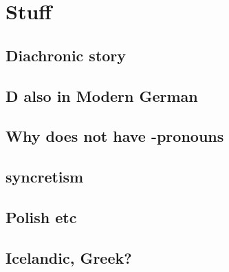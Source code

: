 
\chapter{Stuff}

\section{Diachronic story}

\section{D also in Modern German}

\section{Why  does not have -pronouns}

\section{syncretism}

\section{Polish etc}

\section{Icelandic, Greek?}
